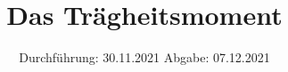 

\subject{V 101}
\title{Das Trägheitsmoment}
\date{%
  Durchführung: 30.11.2021
  \hspace{3em}
  Abgabe: 07.12.2021
}



\maketitle
\thispagestyle{empty}
\tableofcontents
\newpage








\printbibliography{}


